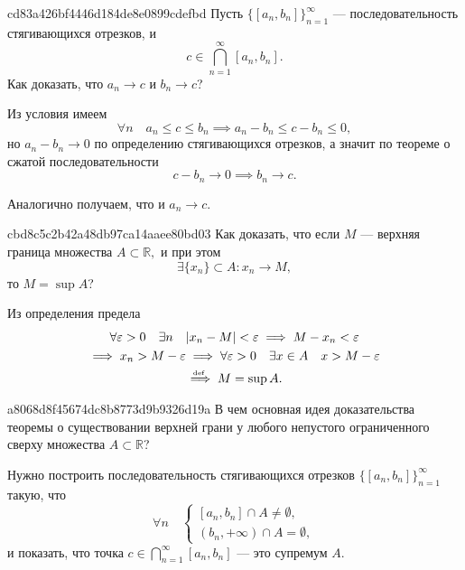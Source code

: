     \begin{note}{cd83a426bf4446d184de8e0899cdefbd}
        Пусть \( \{ [a_n, b_n] \}_{n = 1}^{\infty } \) --- последовательность стягивающихся отрезков, и \[
            c \in \bigcap _{n = 1} ^{\infty } [a_n, b_n].
        \]
        Как доказать, что \( a_n \to c \) и \(b_n \to c\)?

        \begin{cloze}{1}
            Из условия имеем \[
                \forall n \quad a_n \leqslant c \leqslant b_n \implies a_n - b_n \leqslant c - b_n \leqslant 0,
            \]
            но \( a_n - b_n \to 0 \) по определению стягивающихся отрезков, а значит по теореме о сжатой последовательности \[
                c - b_n \to 0 \implies b_n \to c.
            \]

            Аналогично получаем, что и \( a_n \to c. \)
        \end{cloze}
    \end{note}

    \begin{note}{cbd8c5c2b42a48db97ca14aaee80bd03}
        Как доказать, что если \( M \) --- верхняя граница множества \( A \subset \mathbb R, \) и при этом \[
            \exists \{ x_n \} \subset A : x_n \to M,
        \] то \( M = \sup A \)?

        \begin{cloze}{1}
            Из определения предела
            \begin{multline*}
                \forall \varepsilon > 0 \quad \exists n \quad |x_n - M| < \varepsilon \implies M - x_n < \varepsilon \\
                \implies x_n > M - \varepsilon \implies \forall \varepsilon > 0 \quad \exists x \in A \quad x > M - \varepsilon \\
                \overset{\!\!\text{\tiny def}}\implies M = \sup A.
            \end{multline*}
        \end{cloze}
    \end{note}

    \begin{note}{a8068d8f45674dc8b8773d9b9326d19a}
        В чем основная идея доказательства теоремы о существовании верхней грани у любого непустого ограниченного сверху множества \( A \subset \mathbb R \)?

        \begin{cloze}{1}
            Нужно построить последовательность стягивающихся отрезков \( \{ [a_n, b_n ] \}_{n = 1}^{\infty} \) такую, что
            \[
                \forall n \quad
                \begin{cases}
                    [a_n, b_n ] \cap A \neq \emptyset, \\
                    (b_n, +\infty ) \cap A = \emptyset,
                \end{cases}
            \]
            и показать, что точка \( \displaystyle c \in \bigcap_{n = 1}^{\infty } [a_n, b_n ] \) --- это супремум \( A. \)
        \end{cloze}
    \end{note}

